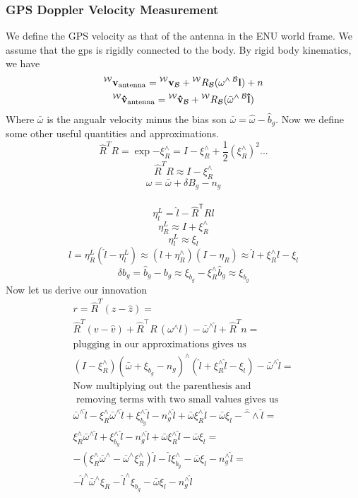\subsubsection{GPS Doppler Velocity Measurement}
We define the GPS velocity as that of the antenna in the ENU world frame. We assume that the gps is rigidly connected to the body. By rigid body kinematics, we have
\begin{equation}
\begin{gathered}
\fv{W}{v}_{\mathrm{antenna}}=\fv{W}{v}_{\mathcal{B}}+\rotmat{W}{\mathcal{B}}(\omega^\wedge\,\fv{\mathcal{B}}{l})+n\\

\fv{W}{\hat v}_{\mathrm{antenna}}=\fv{W}{\hat v}_{\mathcal{B}}+\rotmat{W}{\mathcal{B}}(\bar\omega^\wedge\,\fv{\mathcal{B}}{\hat l})
\end{gathered}
\end{equation}
Where $\bar \omega$ is the angualr velocity minus the bias son $\bar \omega = \hat \omega - \hat b_g$. 
Now we define some other useful quantities and approximations.\\
$$\hat R^T R =\exp{-\xi_R^\wedge}=I-\xi_R^\wedge+\frac{1}{2}(\xi_R^\wedge)^2...$$
$$\hat R^T R \approx I- \xi_R^\wedge$$
$$\omega = \bar \omega+ \delta B_g-n_g$$\\
$$\eta^L_l = \hat{l} - \hat R^\mathsf{T}Rl$$
$$\eta^L_R \approx I + \xi_R^\wedge$$ 
$$\eta^L_l \approx \xi_l$$
$$l = \eta^L_R(\hat{l} - \eta^L_l)\approx(l+\eta^{\wedge}_R)(I -\eta_R)\approx\hat{l} + \xi_R^\wedge\hat{l} - \xi_l$$
$$\delta{b}_g = \hat{{b}}_g - {b}_g \approx \xi_{b_g} - \xi_R^\wedge\hat{{b}}_g\approx\xi_{b_g}$$
Now let us derive our innovation 
\begin{equation}
  \begin{aligned}
r = \hat R^T(z-\hat z)=\\
\hat R^T(v-\hat v)+\hat R^\top R\,(\omega^\wedge{l}) - \bar{\omega}^\wedge\hat{{l}}+\hat R^T n=\\
\text{plugging in our approximations gives us}\\
(I - \xi_R^\wedge)(\bar{\omega} + \xi_{b_g} - {n}_g)^\wedge(\hat{{l}} + \xi_R^\wedge\hat{{l}} - \xi_l) - \bar{\omega}^\wedge\hat{{l}}=\\
\text{Now multiplying out the parenthesis and}\\\text{ removing terms with two small values gives us}\\
\bar \omega^\wedge \hat l - \xi_R^\wedge \bar \omega^\wedge \hat l + \xi_{b_g}^\wedge \hat l-n_g^\wedge \hat l+\bar \omega\xi_R^\wedge \hat l - \bar \omega \xi_l -\bar^\wedge \hat l=\\
 \xi_R^\wedge \bar \omega^\wedge \hat l + \xi_{b_g}^\wedge \hat l-n_g^\wedge \hat l+\bar \omega\xi_R^\wedge \hat l - \bar \omega \xi_l =\\
 -(\xi_R^\wedge \bar \omega^\wedge-\bar \omega^\wedge\xi_R^\wedge )\hat l-\hat l \xi_{b_g}^\wedge-\bar \omega \xi_l-n_g^\wedge \hat l=\\
-\hat l^\wedge \bar \omega^\wedge \xi_R-\hat l^\wedge \xi_{b_g}-\bar \omega \xi_l-n_g^\wedge \hat l
  \end{aligned}
\end{equation}
